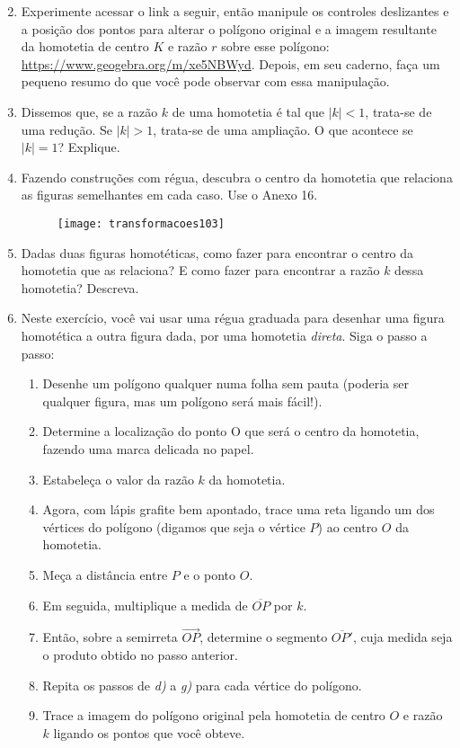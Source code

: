 \begin{enumerate}
\setcounter{enumi}{1}
\item Experimente acessar o link a seguir, então manipule os controles deslizantes e a posição dos pontos para alterar o polígono original e a imagem resultante da homotetia de centro $K$ e razão $r$ sobre esse polígono: \url{https://www.geogebra.org/m/xe5NBWyd}. Depois, em seu caderno, faça um pequeno resumo do que você pode observar com essa manipulação. 

\item Dissemos que, se a razão $k$ de uma homotetia é tal que $|k|<1$, trata-se de uma redução. Se $|k|>1$, trata-se de uma ampliação. O que acontece se $|k|=1$? Explique.

\item Fazendo construções com régua, descubra o centro da homotetia que relaciona as figuras semelhantes em cada caso.  Use o Anexo 16.

\begin{figure}[H]
\centering

\texttt{[image: transformacoes103]}
\end{figure}

\item Dadas duas figuras homotéticas, como fazer para encontrar o centro da homotetia que as relaciona? E como fazer para encontrar a razão $k$ dessa homotetia? Descreva. 

\item   Neste exercício, você vai usar uma régua graduada para desenhar uma figura homotética a outra figura dada, por uma homotetia \textit{direta}. Siga o passo a passo: 
\begin{enumerate}
\item Desenhe um polígono qualquer numa folha sem pauta (poderia ser qualquer figura, mas um polígono será mais fácil!).
\item Determine a localização do ponto O que será o centro da homotetia, fazendo uma marca delicada no papel. 
\item Estabeleça o valor da razão $k$ da homotetia. 
\item Agora, com lápis grafite bem apontado, trace uma reta ligando um dos vértices do polígono (digamos que seja o vértice $P$) ao centro $O$ da homotetia. 
\item Meça a distância entre $P$ e o ponto $O$. 
\item Em seguida, multiplique a medida de $\overline{OP}$ por $k$. 
\item Então, sobre a semirreta $\overrightarrow{OP}$, determine o segmento $\overline{OP'}$, cuja medida seja o produto obtido no passo anterior.
\item Repita os passos de \textit{d)} a \textit{g)} para cada vértice do polígono. 
\item Trace a imagem do polígono original pela homotetia de centro $O$ e razão $k$ ligando os pontos que você obteve.
\end{enumerate}


\end{enumerate}
